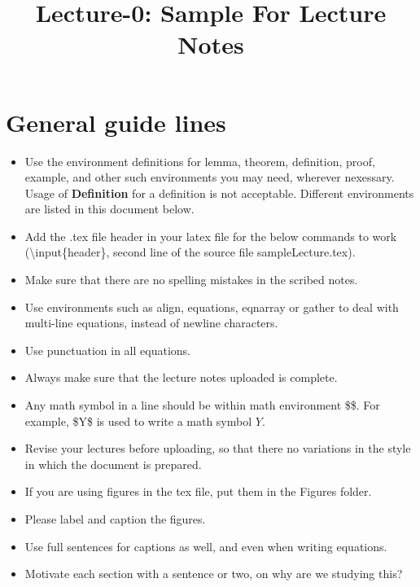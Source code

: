 \documentclass[a4paper,english,12pt]{article}
\title{Lecture-0: Sample For Lecture Notes}
\author{}
\begin{document}
\maketitle
\section{General guide lines}
\begin{itemize}
\item Use the environment definitions for lemma, theorem, definition, proof, example, and other such environments you may need, wherever nexessary. Usage of {\bf Definition} for a definition is not acceptable. Different environments are listed in this document below.
\item Add the .tex file header in your latex file for the below commands to work (\textbackslash input\{header\}, second line of the source file sampleLecture.tex).
\item Make sure that there are no spelling mistakes in the scribed notes.
\item Use environments such as align, equations, eqnarray or gather to deal with multi-line equations, instead of newline characters. 
\item Use punctuation in all equations.
\item Always make sure that the lecture notes uploaded is complete.
\item Any math symbol in a line should be within math environment \$\$. For example, \$Y\$ is used to write a math symbol $Y$.
\item Revise your lectures before uploading, so that there no variations in the style in which the document is prepared.
\item If you are using figures in the tex file, put them in the Figures folder.
\item Please label and caption the figures.
\item Use full sentences for captions as well, and even when writing equations.
\item Motivate each section with a sentence or two, on why are we studying this?
\end{itemize}
\end{document}
